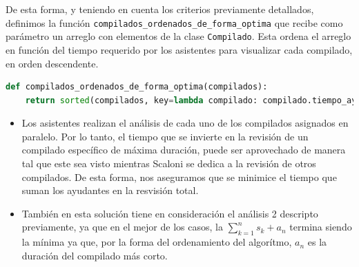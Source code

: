 De esta forma, y teniendo en cuenta los criterios previamente detallados, definimos la función
\texttt{compilados\_ordenados\_de\_forma\_optima} que recibe como parámetro un arreglo con
elementos de la clase \texttt{Compilado}. Esta ordena el arreglo en función del tiempo requerido
por los asistentes para visualizar cada compilado, en orden descendente. 

\begin{lstlisting}[language=Python]
def compilados_ordenados_de_forma_optima(compilados):
    return sorted(compilados, key=lambda compilado: compilado.tiempo_ayudante, reverse=True)
\end{lstlisting}



\begin{itemize}
    \item Los asistentes realizan el análisis de cada uno de los compilados asignados en paralelo. Por lo 
tanto, el tiempo que se invierte en la revisión de un compilado específico de máxima duración, 
puede ser aprovechado de manera tal que este sea visto mientras Scaloni se dedica a la revisión
de otros compilados. De esta forma, nos aseguramos que se minimice el tiempo que suman los ayudantes 
en la resvisión total. 
    \item También en esta solución tiene en consideración el análisis 2 descripto previamente, ya que en el mejor de los casos,
    la $\sum_{k=1}^{n} s_k + a_n$ termina siendo la mínima ya que, por la forma del ordenamiento del algorítmo, $a_n$ es la duración del compilado más corto.

\end{itemize}